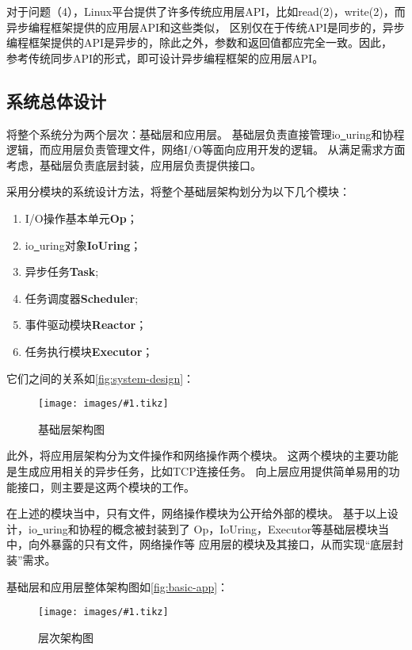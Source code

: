 \documentclass[supercite]{HustGraduPaper}
\newcommand{\cfig}[3]{
  \begin{figure}[htb]
    \centering
    \texttt{[image: images/\#1.tikz]}
    \caption{#3}
    \label{fig:#1}
  \end{figure}
}
\newcommand{\rfig}[1]{\autoref{fig:#1}}
\theoremstyle{definition}
\begin{document}
对于问题（4），Linux平台提供了许多传统应用层API，比如read(2)，write(2)，而异步编程框架提供的应用层API和这些类似，
区别仅在于传统API是同步的，异步编程框架提供的API是异步的，除此之外，参数和返回值都应完全一致。因此，
参考传统同步API的形式，即可设计异步编程框架的应用层API。\par

\subsection{系统总体设计}

将整个系统分为两个层次：基础层和应用层。
基础层负责直接管理io\underline{~}uring和协程逻辑，而应用层负责管理文件，网络I/O等面向应用开发的逻辑。
从满足需求方面考虑，基础层负责底层封装，应用层负责提供接口。\par

采用分模块的系统设计方法，将整个基础层架构划分为以下几个模块：

\begin{enumerate}[label={(\arabic*)}]
  \item I/O操作基本单元\textbf{Op}；
  \item io\underline{~}uring对象\textbf{IoUring}；
  \item 异步任务\textbf{Task};
  \item 任务调度器\textbf{Scheduler};
  \item 事件驱动模块\textbf{Reactor}；
  \item 任务执行模块\textbf{Executor}；
\end{enumerate}

它们之间的关系如\rfig{system-design}：\par

\cfig{system-design}{0.9}{基础层架构图}

此外，将应用层架构分为文件操作和网络操作两个模块。
这两个模块的主要功能是生成应用相关的异步任务，比如TCP连接任务。
向上层应用提供简单易用的功能接口，则主要是这两个模块的工作。\par

在上述的模块当中，只有文件，网络操作模块为公开给外部的模块。
基于以上设计，io\underline{~}uring和协程的概念被封装到了
Op，IoUring，Executor等基础层模块当中，向外暴露的只有文件，网络操作等
应用层的模块及其接口，从而实现“底层封装”需求。\par

基础层和应用层整体架构图如\rfig{basic-app}：\par

\cfig{basic-app}{0.5}{层次架构图}
\end{document}
